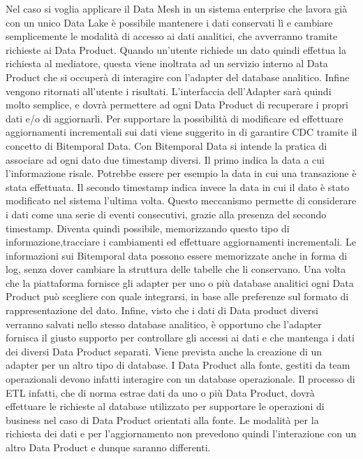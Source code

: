 \documentclass[12pt]{report}
\begin{document}
Nel caso si voglia applicare il Data Mesh in un sistema enterprise che lavora già con un unico Data Lake è possibile mantenere i dati conservati lì e cambiare semplicemente le modalità di accesso ai dati analitici, che avverranno tramite richieste ai Data Product.
Quando un'utente richiede un dato quindi effettua la richiesta al mediatore, questa viene inoltrata ad un servizio interno al Data Product che si occuperà di interagire con l'adapter del database analitico. 
Infine vengono ritornati all'utente i risultati.
L'interfaccia dell'Adapter sarà quindi molto semplice, e dovrà permettere ad ogni Data Product di recuperare i propri dati e/o di aggiornarli.
Per supportare la possibilità di modificare ed effettuare aggiornamenti incrementali sui dati viene suggerito in \cite{zhamak_dehgani_data_2023,fowlerBitemporalNodate}
di garantire CDC tramite il concetto di Bitemporal Data.
Con Bitemporal Data si intende la pratica di associare ad ogni dato due timestamp diversi. 
Il primo indica la data a cui l'informazione risale. 
Potrebbe essere per esempio la data in cui una transazione è stata effettuata.
Il secondo timestamp indica invece la data in cui il dato è stato modificato nel sistema l'ultima volta.
Questo meccanismo permette di considerare i dati come una serie di eventi consecutivi, grazie alla presenza del secondo timestamp.
Diventa quindi possibile, memorizzando questo tipo di informazione,tracciare i cambiamenti ed effettuare aggiornamenti incrementali.
Le informazioni sui Bitemporal data possono essere memorizzate anche in forma di log, senza dover cambiare la struttura delle tabelle che li conservano.
Una volta che la piattaforma fornisce gli adapter per uno o più database analitici ogni Data Product può scegliere con quale integrarsi, in base alle preferenze sul formato di rappresentazione del dato.
Infine, visto che i dati di Data product diversi verranno salvati nello stesso database analitico, è opportuno che l'adapter fornisca il giusto supporto per controllare gli accessi ai dati e che mantenga i dati dei diversi Data Product separati.
Viene prevista anche la creazione di un adapter per un altro tipo di database.
I Data Product alla fonte, gestiti da team operazionali devono infatti interagire con un database operazionale.
Il processo di ETL infatti, che di norma estrae dati da uno o più Data Product, dovrà effettuare le richieste al database  utilizzato per supportare le operazioni di business nel caso di Data Product orientati alla fonte.
Le modalità per la richiesta dei dati e per l'aggiornamento non prevedono quindi l'interazione con un altro Data Product e dunque saranno differenti.
\end{document}
